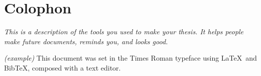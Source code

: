 \chapter{Colophon}
\label{appendixlabel3}
\textit{This is a description of the tools you used to make your thesis. It helps people make future documents, reminds you, and looks good.}

\textit{(example)} This document was set in the Times Roman typeface using \LaTeX\ and Bib\TeX , composed with a text editor.

